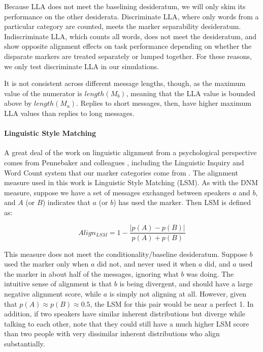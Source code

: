 \documentclass{acm_proc_article-sp}
\begin{document}
Because LLA does not meet the baselining desideratum, we will only skim its performance on the other desiderata. Discriminate LLA, where only words from a particular category are counted, meets the marker separability desideratum.  Indiscriminate LLA, which counts all words, does not meet the desideratum, and \cite{FusaroliEtAl2012} show opposite alignment effects on task performance depending on whether the disparate markers are treated separately or lumped together.  For these reasons, we only test discriminate LLA in our simulations.

It is not consistent across different message lengths, though, as the maximum value of the numerator is $length(M_b)$, meaning that the LLA value is bounded above by $length(M_a)$. Replies to short messages, then, have higher maximum LLA values than replies to long messages.

\paragraph{Linguistic Style Matching} A great deal of the work on linguistic alignment from a psychological perspective comes from Pennebaker and colleagues \cite{NiederhofferPennebaker2002,GonzalesHancockPennebaker2010,IrelandEtAl2011}, including the Linguistic Inquiry and Word Count system that our marker categories come from \cite{LIWC}.  The alignment measure used in this work is Linguistic Style Matching (LSM). As with the DNM measure, suppose we have a set of messages exchanged between speakers $a$ and $b$, and $A$ (or $B$) indicates that $a$ (or $b$) has used the marker. Then LSM is defined as:

\begin{equation}
Align_{LSM} = 1 - \frac{|p(A)-p(B)|}{p(A)+p(B)}
\end{equation}

This measure does not meet the conditionality/baseline desideratum. Suppose $b$ used the marker only when $a$ did not, and never used it when $a$ did, and $a$ used the marker in about half of the messages, ignoring what $b$ was doing.  The intuitive sense of alignment is that $b$ is being divergent, and should have a large negative alignment score, while $a$ is simply not aligning at all. However, given that $p(A) \approx p(B) \approx 0.5$, the LSM for this pair would be near a perfect 1.  In addition, if two speakers have similar inherent distributions but diverge while talking to each other, note that they could still have a much higher LSM score than two people with very dissimilar inherent distributions who align substantially.
\end{document}

